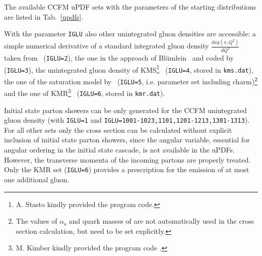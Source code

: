 \documentclass[11pt]{article} \usepackage{mystyle-new}
\newcommand{\as}{\alpha_\mathrm{s}}
\begin{document}
The available CCFM uPDF sets with the parameters of the starting distributions are listed in Tab.~\ref{updfs}.
\par
With the parameter \verb+IGLU+ also other unintegrated gluon densities
are accessible:
a simple numerical derivative of a standard integrated gluon density
$\frac{d xg(x,Q^2)}{dQ^2}$ taken
from~\cite{GRV95}  (\verb+IGLU=2+), the one in the
approach 
of Bl\"umlein~\cite{Bluemlein} and coded 
by~\cite{baranov_zotov_1999,baranov_zotov_2000} (\verb+IGLU=3+),
the unintegrated gluon density of KMS\footnote{A. Stasto kindly
provided the program code.}~\cite{martin_stasto} 
(\verb+IGLU=4+, stored in \verb+kms.dat+), 
the one of the saturation model by~\cite{wuesthoff_golec-biernat}
 (\verb+IGLU=5+, i.e. parameter set including charm)\footnote{The values of $\as$ and quark masses of \protect\cite{wuesthoff_golec-biernat} are not automatically used in the cross section calculation, but need to be set explicitly. } 
 and the one of KMR\footnote{M. Kimber kindly
provided the program code .}~\cite{martin_kimber} (\verb+IGLU=6+, 
stored in \verb+kmr.dat+). 

Initial state parton showers can be only generated for the CCFM unintegrated gluon density (with \verb+IGLU=1+ and 
\verb+IGLU=1001-1023,1101,1201-1213,1301-1313+). For all other sets only the cross section can be calculated without explicit inclusion of initial state parton showers, since the angular variable,
essential for angular ordering in the initial state cascade, is not available in the uPDFs.
However, the transverse momenta of the incoming partons are properly treated. 
Only the KMR set (\verb+IGLU=6+) provides a prescription for the emission of at
most one additional gluon.
\end{document}
